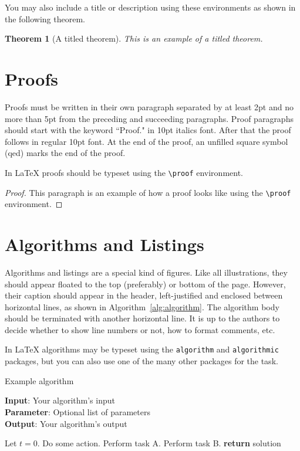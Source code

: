 \documentclass{article}
\newtheorem{theorem}{Theorem}
\begin{document}
You may also include a title or description using these environments as shown in the following theorem.

\begin{theorem}[A titled theorem]
This is an example of a titled theorem.
\end{theorem}

\section{Proofs}

Proofs must be written in their own paragraph separated by at least 2pt and no
more than 5pt from the preceding and succeeding paragraphs. Proof paragraphs
should start with the keyword ``Proof." in 10pt italics font. After that the
proof follows in regular 10pt font. At the end of the proof, an unfilled square
symbol (qed) marks the end of the proof.

In \LaTeX{} proofs should be typeset using the \texttt{\textbackslash{}proof}
environment.

\begin{proof}
This paragraph is an example of how a proof looks like using the
\texttt{\textbackslash{}proof} environment.
\end{proof}


\section{Algorithms and Listings}

Algorithms and listings are a special kind of figures. Like all illustrations,
they should appear floated to the top (preferably) or bottom of the
page. However, their caption should appear in the header, left-justified and
enclosed between horizontal lines, as shown in
Algorithm~\ref{alg:algorithm}. The algorithm body should be terminated with
another horizontal line. It is up to the authors to decide whether to show line
numbers or not, how to format comments, etc.

In \LaTeX{} algorithms may be typeset using the \texttt{algorithm} and
\texttt{algorithmic} packages, but you can also use one of the many other
packages for the task.

\begin{algorithm}[tb]
\caption{Example algorithm}
\label{alg:algorithm}
\textbf{Input}: Your algorithm's input\\
\textbf{Parameter}: Optional list of parameters\\
\textbf{Output}: Your algorithm's output
\begin{algorithmic}[1] %
\STATE Let $t=0$.
\STATE Do some action.
\STATE Perform task A.
\ELSE
\STATE Perform task B.
\ENDIF
\ENDWHILE
\STATE \textbf{return} solution
\end{algorithmic}
\end{algorithm}
\end{document}
